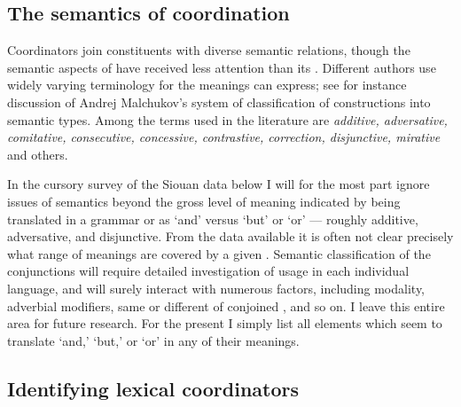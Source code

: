 \documentclass[output=paper]{LSP/langsci}
\begin{document}
\subsection{The semantics of coordination}

Coordinators join constituents with diverse semantic relations, though the semantic aspects of  have received less attention than its . Different authors use widely varying terminology for the meanings  can express; see for instance  discussion of Andrej Malchukov's system of classification of  constructions into semantic types. Among the terms used in the literature are \textit{additive, adversative, comitative, consecutive, concessive, contrastive, correction, disjunctive, mirative} and others.

In the cursory survey of the Siouan data below I will for the most part ignore issues of semantics beyond the gross level of meaning indicated by being translated in a grammar or  as `and' versus `but' or `or' --- roughly additive, adversative, and disjunctive. From the data available it is often not clear precisely what range of meanings are covered by a given . Semantic classification of the conjunctions will require detailed investigation of usage in each individual language, and will surely interact with numerous factors, including modality, adverbial modifiers, same or different  of conjoined , and so on. I leave this entire area for future research. For the present I simply list all elements which seem to translate `and,' `but,' or `or' in any of their meanings.

\subsection{Identifying lexical coordinators}
\end{document}
